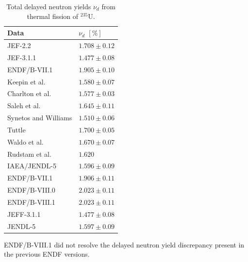 \begin{table}[!h]
    \centering
    \caption{Total delayed neutron yields $\nu_d$ from thermal fission of $^{235}$U.}
    \begin{threeparttable}
    \begin{tabular}{ll}
        \hline
       Data & $\nu_d$ $[\%]$ \\
       \hline
        JEF-2.2 \cite{bank2000jef, huynh2014calculation} & $1.708 \pm 0.12$\\
        JEF-3.1.1 \cite{santamarina2009jeff, huynh2014calculation} & $1.477 \pm 0.08$\\
        ENDF/B-VII.1 \cite{chadwick2011endf, huynh2014calculation} & $1.905 \pm 0.10$\\
        Keepin et al. \cite{keepin1957delayed} & $1.580 \pm 0.07$ \\
        Charlton et al. \cite{charlton1996delayed} & $1.577 \pm 0.03$\\
        Saleh et al. \cite{saleh1997measurements} & $1.645 \pm 0.11$ \\
        Synetos and Williams \cite{synetos1983delayed} & $1.510 \pm 0.06$ \\
        Tuttle \cite{tuttle1975delayed} & $1.700 \pm  0.05$\\
        Waldo et al.\cite{waldo1981delayed} & $1.670 \pm 0.07$ \\
        Rudstam et al. \cite{rudstam2002delayed} & $1.620$\\
        \hline
        IAEA/JENDL-5 \cite{DIMITRIOU2021144, iwamoto2023japanese} & $1.596 \pm 0.09$\\
        ENDF/B-VII.1 \cite{chadwick2011endf} & $1.906 \pm 0.11$\\
        ENDF/B-VIII.0 \cite{Brown20181} & $2.023 \pm 0.11$\\
        ENDF/B-VIII.1 \cite{nobreENDFBVIII12024}\tnote{*} & $2.023 \pm 0.11$\\
        JEFF-3.1.1 \cite{santamarina2009jeff} & $1.477 \pm 0.08$\\
        JENDL-5 \cite{iwamoto2023japanese} & $1.597 \pm 0.09$ \\
        \hline
    \end{tabular}
    \begin{tablenotes}
    \small
    \item[*] ENDF/B-VIII.1 did not resolve the delayed neutron yield discrepancy present in the previous ENDF versions.
    \end{tablenotes}
    \end{threeparttable}
    \label{tab:total-delnu-compare-net}
\end{table}

